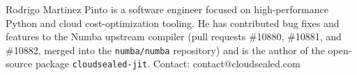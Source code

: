 \documentclass[journal]{IEEEtran}
\begin{document}
\begin{IEEEbiographynophoto}{Rodrigo Martinez Pinto}
is a software engineer focused on high-performance Python and cloud
cost-optimization tooling. He has contributed bug fixes and features to the
Numba upstream compiler (pull requests \#10880, \#10881, and \#10882, merged
into the \texttt{numba/numba} repository) and is the author of the open-source
package \texttt{cloudsealed-jit}. Contact: contact@cloudsealed.com
\end{IEEEbiographynophoto}
\end{document}
